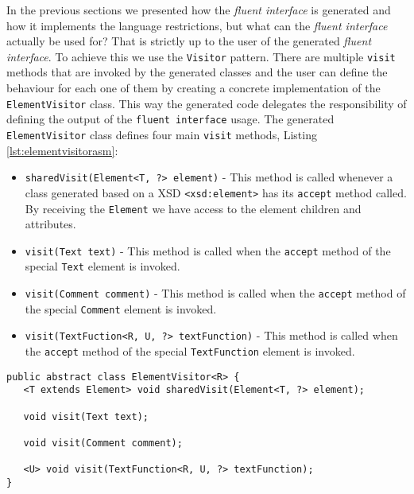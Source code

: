 In the previous sections we presented how the \textit{fluent interface} is generated and how it implements the language restrictions, but what can the \textit{fluent interface} actually be used for? That is strictly up to the user of the generated \textit{fluent interface}. To achieve this we use the \texttt{Visitor} pattern\citep{gamma1994design}. There are multiple \texttt{visit} methods that are invoked by the generated classes and the user can define the behaviour for each one of them by creating a concrete implementation of the \texttt{ElementVisitor} class. This way the generated code delegates the responsibility of defining the output of the \texttt{fluent interface} usage. The generated \texttt{ElementVisitor} class defines four main \texttt{visit} methods, Listing \ref{lst:elementvisitorasm}:

\begin{itemize}
	\item \texttt{sharedVisit(Element<T, ?> element)} - This method is called whenever a class generated based on a \ac{XSD} \texttt{<xsd:element>} has its \texttt{accept} method called. By receiving the \texttt{Element} we have access to the element children and attributes.
	\item \texttt{visit(Text text)} - This method is called when the \texttt{accept} method of the special \texttt{Text} element is invoked.
	\item \texttt{visit(Comment comment)} - This method is called when the \texttt{accept} method of the special \texttt{Comment} element is invoked.
	\item \texttt{visit(TextFuction<R, U, ?> textFunction)} - This method is called when the \texttt{accept} method of the special \texttt{TextFunction} element is invoked.
\end{itemize}	

\bigskip


\begin{minipage}{\linewidth}
\begin{lstlisting}[caption={ElementVisitor Generated by XsdAsm - The Core Methods},label={lst:elementvisitorasm}]
public abstract class ElementVisitor<R> {
   <T extends Element> void sharedVisit(Element<T, ?> element);

   void visit(Text text);

   void visit(Comment comment);

   <U> void visit(TextFunction<R, U, ?> textFunction);
}
\end{lstlisting}
\end{minipage}

